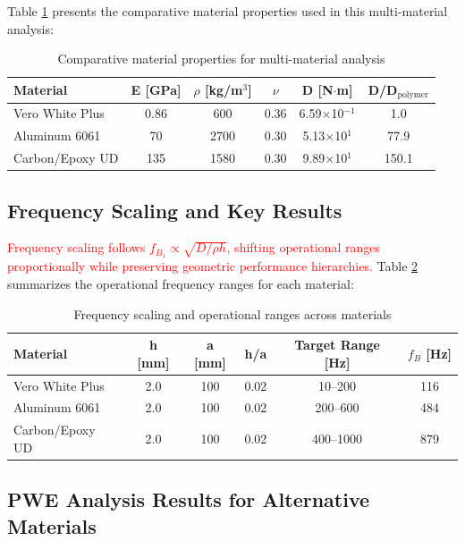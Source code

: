 \documentclass[review,numbers,sort&compress]{elsarticle}
\begin{document}
Table \ref{tab:material_properties_comparison} presents the comparative material properties used in this multi-material analysis:

\begin{table}[!htb]
\centering
\caption{Comparative material properties for multi-material analysis}
\label{tab:material_properties_comparison}
\small
\begin{tabular}{lccccc}
\hline
Material & E [GPa] & $\rho$ [kg/m$^3$] & $\nu$ & D [N$\cdot$m] & D/D$_{\text{polymer}}$ \\
\hline
Vero White Plus & 0.86 & 600 & 0.36 & 6.59$\times$10$^{-1}$ & 1.0 \\
Aluminum 6061 & 70 & 2700 & 0.30 & 5.13$\times$10$^{1}$ & 77.9 \\
Carbon/Epoxy UD & 135 & 1580 & 0.30 & 9.89$\times$10$^{1}$ & 150.1 \\
\hline
\end{tabular}
\end{table}

\subsection{Frequency Scaling and Key Results}

\textcolor{red}{Frequency scaling follows $f_{B_1} \propto \sqrt{D/\rho h}$, shifting operational ranges proportionally while preserving geometric performance hierarchies.} Table \ref{tab:frequency_scaling} summarizes the operational frequency ranges for each material:

\begin{table}[!htb]
\centering
\caption{Frequency scaling and operational ranges across materials}
\label{tab:frequency_scaling}
\small
\begin{tabular}{lccccc}
\hline
Material & h [mm] & a [mm] & h/a & Target Range [Hz] & $f_B$ [Hz] \\
\hline
Vero White Plus & 2.0 & 100 & 0.02 & 10--200 & 116 \\
Aluminum 6061 & 2.0 & 100 & 0.02 & 200--600 & 484 \\
Carbon/Epoxy UD & 2.0 & 100 & 0.02 & 400--1000 & 879 \\
\hline
\end{tabular}
\end{table}

\subsection{PWE Analysis Results for Alternative Materials}
\end{document}

